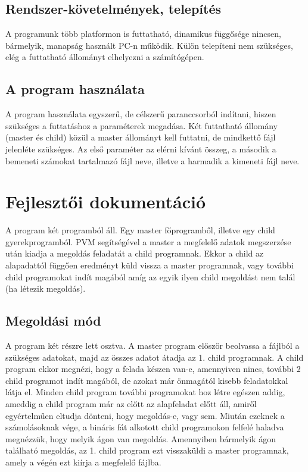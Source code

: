 \documentclass[12pt]{article}
\begin{document}
\subsection{Rendszer-követelmények, telepítés}

A programunk több platformon is futtatható, dinamikus függősége nincsen, bármelyik, manapság használt PC-n működik. Külön telepíteni nem szükséges, elég a futtatható állományt elhelyezni a számítógépen.

\subsection{A program használata}

A program használata egyszerű, de célszerű paranccsorból indítani, hiszen szükséges a futtatáshoz a paraméterek megadása. Két futtatható állomány (master és child) közül a master állományt kell futtatni, de mindkettő fájl jelenléte szükséges. Az első paraméter az elérni kívánt összeg, a második a bemeneti számokat tartalmazó fájl neve, illetve a harmadik a kimeneti fájl neve.


\section{Fejlesztői dokumentáció}

A program két programból áll. Egy master főprogramből, illetve egy child gyerekprogramból. PVM segítségével a master a megfelelő adatok megszerzése után kiadja a megoldás feladatát a child programnak. Ekkor a child az alapadattól függően eredményt küld vissza a master programnak, vagy további child programokat indít magából amíg az egyik ilyen child megoldást nem talál (ha létezik megoldás).

\subsection{Megoldási mód}

A program két részre lett osztva. A master program először beolvassa a fájlból a szükséges adatokat, majd az összes adatot átadja az 1. child programnak. A child program ekkor megnézi, hogy a felada készen van-e, amennyiven nincs, további 2 child programot indít magából, de azokat már önmagától kisebb feladatokkal látja el. Minden child program további programokat hoz létre egészen addig, ameddig a child program már az előtt az alapfeladat előtt áll, amiről egyértelműen eltudja dönteni, hogy megoldás-e, vagy sem. Miután ezeknek a számolásoknak vége, a bináris fát alkotott child programokon felfelé haladva megnézzük, hogy melyik ágon van megoldás. Amennyiben bármelyik ágon található megoldás, az 1. child program ezt visszaküldi a master programnak, amely a végén ezt kiírja a megfelelő fájlba.
\end{document}
